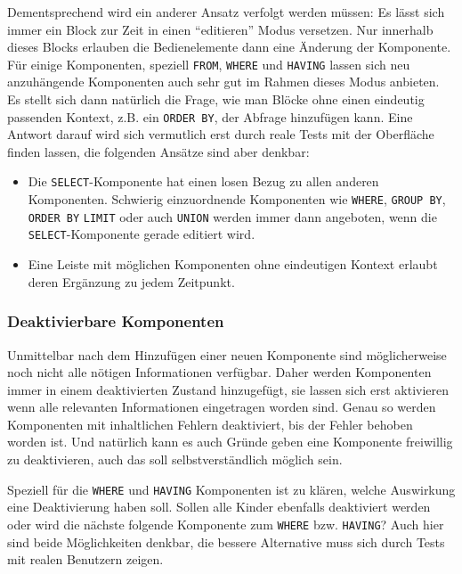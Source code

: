 \documentclass[paper=a4,fontsize=11pt,parskip=half]{scrartcl}
\begin{document}
Dementsprechend wird ein anderer Ansatz verfolgt werden müssen: Es lässt sich immer ein Block zur Zeit in einen ``editieren'' Modus versetzen. Nur innerhalb dieses Blocks erlauben die Bedienelemente dann eine Änderung der Komponente. Für einige Komponenten, speziell \texttt{FROM}, \texttt{WHERE} und \texttt{HAVING} lassen sich neu anzuhängende Komponenten auch sehr gut im Rahmen dieses Modus anbieten. Es stellt sich dann natürlich die Frage, wie man Blöcke ohne einen eindeutig passenden Kontext, z.B. ein \texttt{ORDER BY}, der Abfrage hinzufügen kann. Eine Antwort darauf wird sich vermutlich erst durch reale Tests mit der Oberfläche finden lassen, die folgenden Ansätze sind aber denkbar:

\begin{itemize}
  \item Die \texttt{SELECT}-Komponente hat einen losen Bezug zu allen anderen Komponenten. Schwierig einzuordnende Komponenten wie \texttt{WHERE}, \texttt{GROUP BY}, \texttt{ORDER BY} \texttt{LIMIT} oder auch \texttt{UNION} werden immer dann angeboten, wenn die \texttt{SELECT}-Komponente gerade editiert wird.
  \item Eine Leiste mit möglichen Komponenten ohne eindeutigen Kontext erlaubt deren Ergänzung zu jedem Zeitpunkt.
\end{itemize}


\subsubsection{Deaktivierbare Komponenten}

Unmittelbar nach dem Hinzufügen einer neuen Komponente sind möglicherweise noch nicht alle nötigen Informationen verfügbar. Daher werden Komponenten immer in einem deaktivierten Zustand hinzugefügt, sie lassen sich erst aktivieren wenn alle relevanten Informationen eingetragen worden sind. Genau so werden Komponenten mit inhaltlichen Fehlern deaktiviert, bis der Fehler behoben worden ist. Und natürlich kann es auch Gründe geben eine Komponente freiwillig zu deaktivieren, auch das soll selbstverständlich möglich sein.

Speziell für die \texttt{WHERE} und \texttt{HAVING} Komponenten ist zu klären, welche Auswirkung eine Deaktivierung haben soll. Sollen alle Kinder ebenfalls deaktiviert werden oder wird die nächste folgende Komponente zum \texttt{WHERE} bzw. \texttt{HAVING}? Auch hier sind beide Möglichkeiten denkbar, die bessere Alternative muss sich durch Tests mit realen Benutzern zeigen.
\end{document}
